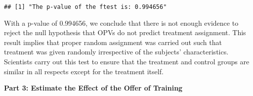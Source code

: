 \documentclass[
]{article}
\newenvironment{Shaded}{\begin{snugshade}}{\end{snugshade}}
\newcommand{\AttributeTok}[1]{\textcolor[rgb]{0.13,0.29,0.53}{#1}}
\newcommand{\CommentTok}[1]{\textcolor[rgb]{0.56,0.35,0.01}{\textit{#1}}}
\newcommand{\DecValTok}[1]{\textcolor[rgb]{0.00,0.00,0.81}{#1}}
\newcommand{\FunctionTok}[1]{\textcolor[rgb]{0.13,0.29,0.53}{\textbf{#1}}}
\newcommand{\NormalTok}[1]{#1}
\newcommand{\OtherTok}[1]{\textcolor[rgb]{0.56,0.35,0.01}{#1}}
\newcommand{\SpecialCharTok}[1]{\textcolor[rgb]{0.81,0.36,0.00}{\textbf{#1}}}
\newcommand{\StringTok}[1]{\textcolor[rgb]{0.31,0.60,0.02}{#1}}
\begin{document}
\begin{Shaded}
\end{Shaded}

\begin{verbatim}
## [1] "The p-value of the ftest is: 0.994656"
\end{verbatim}

With a p-value of 0.994656, we conclude that there is not enough
evidence to reject the null hypothesis that OPVs do not predict
treatment assignment. This result implies that proper random assignment
was carried out such that treatment was given randomly irrespective of
the subjects' characteristics. Scientists carry out this test to ensure
that the treatment and control groups are similar in all respects except
for the treatment itself.

\textbf{Part 3: Estimate the Effect of the Offer of Training}
\end{document}
